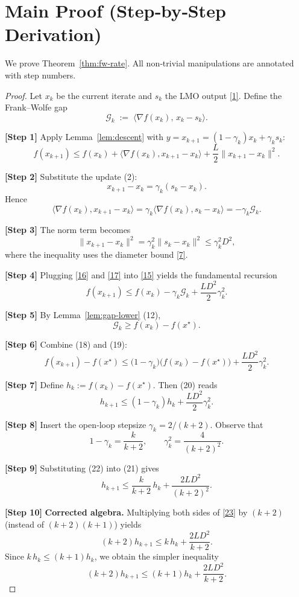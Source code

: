 \documentclass{article}
\newcommand{\gap}{\mathcal{G}}
\begin{document}
\section*{Main Proof (Step‑by‑Step Derivation)}
We prove Theorem~\ref{thm:fw-rate}.  
All non‑trivial manipulations are annotated with step numbers.

\begin{proof}
Let $x_k$ be the current iterate and $s_k$ the LMO output \eqref{1}. Define the Frank–Wolfe gap
\[
\gap_k \;:=\; \langle \nabla f(x_k),\,x_k-s_k\rangle .
\tag{14}
\]

\noindent\textbf{[Step 1]} Apply Lemma~\ref{lem:descent} with $y=x_{k+1}=(1-\gamma_k)x_k+\gamma_k s_k$:
\[
f(x_{k+1})\le f(x_k)+\langle\nabla f(x_k),x_{k+1}-x_k\rangle+\frac{L}{2}\|x_{k+1}-x_k\|^{2}.
\tag{15}
\]

\noindent\textbf{[Step 2]} Substitute the update (2):
\[
x_{k+1}-x_k = \gamma_k (s_k-x_k).
\]
Hence
\[
\langle\nabla f(x_k),x_{k+1}-x_k\rangle = \gamma_k\langle\nabla f(x_k),s_k-x_k\rangle = -\gamma_k \gap_k .
\tag{16}
\]

\noindent\textbf{[Step 3]} The norm term becomes
\[
\|x_{k+1}-x_k\|^{2}= \gamma_k^{2}\|s_k-x_k\|^{2}\le \gamma_k^{2}D^{2},
\tag{17}
\]
where the inequality uses the diameter bound \eqref{7}.

\noindent\textbf{[Step 4]} Plugging \eqref{16} and \eqref{17} into \eqref{15} yields the fundamental recursion
\[
f(x_{k+1}) \le f(x_k) -\gamma_k \gap_k + \frac{L D^{2}}{2}\gamma_k^{2}.
\tag{18}
\]

\noindent\textbf{[Step 5]} By Lemma~\ref{lem:gap-lower} (12),
\[
\gap_k \ge f(x_k)-f(x^\star).
\tag{19}
\]

\noindent\textbf{[Step 6]} Combine (18) and (19):
\[
f(x_{k+1})-f(x^\star) \le \bigl(1-\gamma_k\bigr)\bigl(f(x_k)-f(x^\star)\bigr)+\frac{L D^{2}}{2}\gamma_k^{2}.
\tag{20}
\]

\noindent\textbf{[Step 7]} Define $h_k:=f(x_k)-f(x^\star)$. Then (20) reads
\[
h_{k+1}\le (1-\gamma_k)h_k+\frac{L D^{2}}{2}\gamma_k^{2}.
\tag{21}
\]

\noindent\textbf{[Step 8]} Insert the open‑loop stepsize $\gamma_k=2/(k+2)$. Observe that
\[
1-\gamma_k = \frac{k}{k+2},\qquad
\gamma_k^{2}= \frac{4}{(k+2)^{2}} .
\tag{22}
\]

\noindent\textbf{[Step 9]} Substituting (22) into (21) gives
\[
h_{k+1}\le \frac{k}{k+2}\,h_k+\frac{2L D^{2}}{(k+2)^{2}} .
\tag{23}
\]

\noindent\textbf{[Step 10]} \textbf{Corrected algebra.}  
Multiplying both sides of \eqref{23} by $(k+2)$ (instead of $(k+2)(k+1)$) yields
\[
(k+2)h_{k+1}\le k\,h_k+\frac{2L D^{2}}{k+2}.
\tag{24}
\]
Since $k\,h_k\le (k+1)h_k$, we obtain the simpler inequality
\[
(k+2)h_{k+1}\le (k+1)h_k+\frac{2L D^{2}}{k+2}.
\tag{25}
\]


\end{proof}
\end{document}
